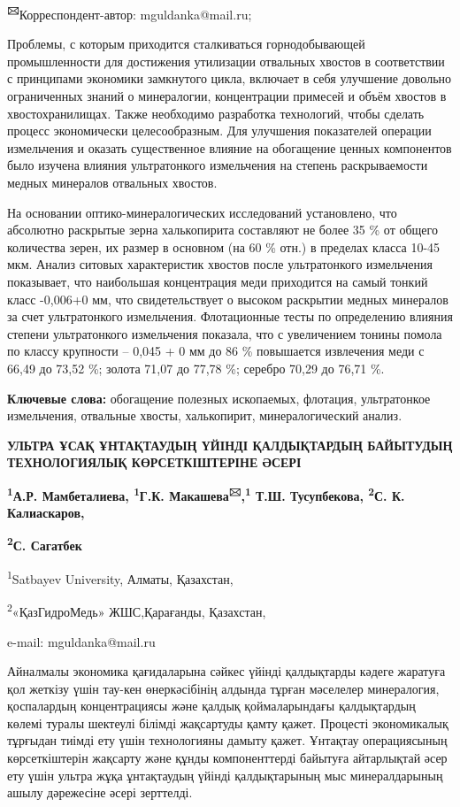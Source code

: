 {\bfseries \textsuperscript{🖂}}Корреспондент-автор: mguldanka@mail.ru;

Проблемы, с которым приходится сталкиваться горнодобывающей
промышленности для достижения утилизации отвальных хвостов в
соответствии с принципами экономики замкнутого цикла, включает в себя
улучшение довольно ограниченных знаний о минералогии, концентрации
примесей и объём хвостов в хвостохранилищах. Также необходимо разработка
технологий, чтобы сделать процесс экономически целесообразным. Для
улучшения показателей операции измельчения и оказать существенное
влияние на обогащение ценных компонентов было изучена влияния
ультратонкого измельчения на степень раскрываемости медных минералов
отвальных хвостов.

На основании оптико-минералогических исследований установлено, что
абсолютно раскрытые зерна халькопирита составляют не более 35 \% от
общего количества зерен, их размер в основном (на 60 \% отн.) в пределах
класса 10-45 мкм. Анализ ситовых характеристик хвостов после
ультратонкого измельчения показывает, что наибольшая концентрация меди
приходится на самый тонкий класс -0,006+0 мм, что свидетельствует о
высоком раскрытии медных минералов за счет ультратонкого измельчения.
Флотационные тесты по определению влияния степени ультратонкого
измельчения показала, что с увеличением тонины помола по классу
крупности -- 0,045 + 0 мм до 86 \% повышается извлечения меди с 66,49 до
73,52 \%; золота 71,07 до 77,78 \%; серебро 70,29 до 76,71 \%.

{\bfseries Ключевые слова:} обогащение полезных ископаемых, флотация,
ультратонкое измельчения, отвальные хвосты, халькопирит,
минералогический анализ.

{\bfseries УЛЬТРА ҰСАҚ ҰНТАҚТАУДЫҢ ҮЙІНДІ ҚАЛДЫҚТАРДЫҢ БАЙЫТУДЫҢ
ТЕХНОЛОГИЯЛЫҚ КӨРСЕТКІШТЕРІНЕ ӘСЕРІ}

{\bfseries \textsuperscript{1}А.Р. Мамбеталиева, \textsuperscript{1}Г.К.
Макашева\textsuperscript{🖂},\textsuperscript{1} Т.Ш. Тусупбекова,
\textsuperscript{2}С. К. Калиаскаров,}

{\bfseries \textsuperscript{2}С. Сагатбек}

\textsuperscript{1}Satbayev University, Алматы, Қазахстан,

\textsuperscript{2}«ҚазГидроМедь» ЖШС,Қарағанды, Қазахстан,

e-mail: mguldanka@mail.ru

Айналмалы экономика қағидаларына сәйкес үйінді қалдықтарды кәдеге
жаратуға қол жеткізу үшін тау-кен өнеркәсібінің алдында тұрған мәселелер
минералогия, қоспалардың концентрациясы және қалдық қоймаларындағы
қалдықтардың көлемі туралы шектеулі білімді жақсартуды қамту қажет.
Процесті экономикалық тұрғыдан тиімді ету үшін технологияны дамыту
қажет. Ұнтақтау операциясының көрсеткіштерін жақсарту және құнды
компоненттерді байытуға айтарлықтай әсер ету үшін ультра жұқа
ұнтақтаудың үйінді қалдықтарының мыс минералдарының ашылу дәрежесіне
әсері зерттелді.

